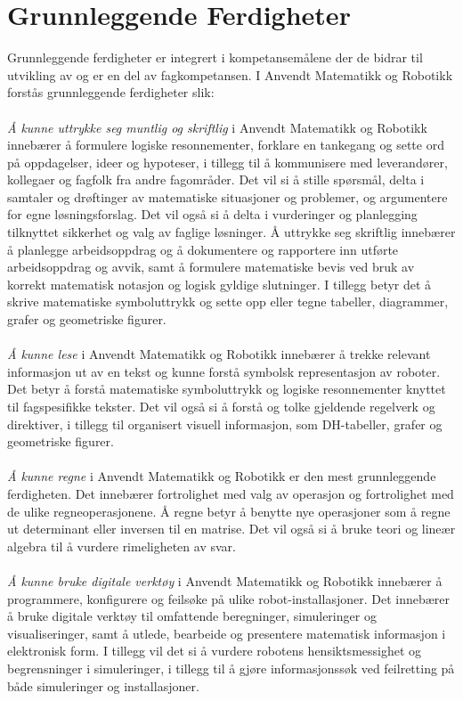 \section*{Grunnleggende Ferdigheter} \label{Sec: GrunnleggendeFerdigheter}


Grunnleggende ferdigheter er integrert i kompetansemålene der de bidrar til utvikling av og er en del av fagkompetansen. I Anvendt Matematikk og Robotikk forstås grunnleggende ferdigheter slik:\\\\
\emph{Å kunne uttrykke seg muntlig og skriftlig} i Anvendt Matematikk og Robotikk innebærer å formulere logiske resonnementer, forklare en tankegang og sette ord på oppdagelser, ideer og hypoteser, i tillegg til å kommunisere med leverandører, kollegaer og fagfolk fra andre fagområder. Det vil si å stille spørsmål, delta i samtaler og drøftinger av matematiske situasjoner og problemer, og argumentere for egne løsningsforslag. Det vil også si å delta i vurderinger og planlegging tilknyttet sikkerhet og valg av faglige løsninger. Å uttrykke seg skriftlig innebærer å planlegge arbeidsoppdrag og å dokumentere og rapportere inn utførte arbeidsoppdrag og avvik, samt å formulere matematiske bevis ved bruk av korrekt matematisk notasjon og logisk gyldige slutninger. I tillegg betyr det å skrive matematiske symboluttrykk og sette opp eller tegne tabeller, diagrammer, grafer og geometriske figurer.\\\\
\emph{Å kunne lese} i Anvendt Matematikk og Robotikk innebærer å trekke relevant informasjon ut av en tekst og kunne forstå symbolsk representasjon av roboter. Det betyr å forstå matematiske symboluttrykk og logiske resonnementer knyttet til fagspesifikke tekster. Det vil også si å forstå og tolke gjeldende regelverk og direktiver, i tillegg til organisert visuell informasjon, som DH-tabeller, grafer og geometriske figurer.\\\\
\emph{Å kunne regne} i Anvendt Matematikk og Robotikk er den mest grunnleggende ferdigheten. Det innebærer fortrolighet med valg av operasjon og fortrolighet med de ulike regneoperasjonene. Å regne betyr å benytte nye operasjoner som å regne ut determinant eller inversen til en matrise. Det vil også si å bruke teori og lineær algebra til å vurdere rimeligheten av svar.\\\\
\emph{Å kunne bruke digitale verktøy} i Anvendt Matematikk og Robotikk innebærer å programmere, konfigurere og feilsøke på ulike robot-installasjoner. Det innebærer å bruke digitale verktøy til omfattende beregninger, simuleringer og visualiseringer, samt å utlede, bearbeide og presentere matematisk informasjon i elektronisk form. I tillegg vil det si å vurdere robotens hensiktsmessighet og begrensninger i simuleringer, i tillegg til å gjøre informasjonssøk ved feilretting på både simuleringer og installasjoner.
